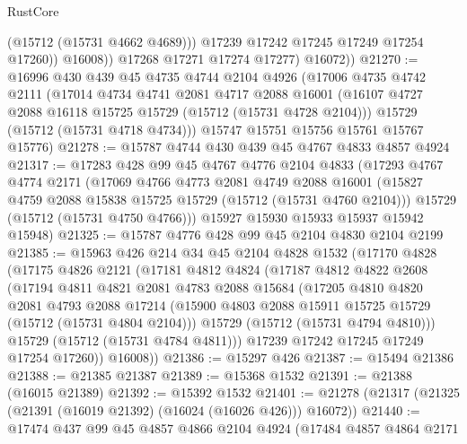 \begin{lexlean}{RustCore}
\begin{coremodule}
                    (@15712 (@15731 @4662 @4689)))
                  @17239
                  @17242
                  @17245
                  @17249
                  @17254
                  @17260))
              @16008))
          @17268
          @17271
          @17274
          @17277)
        @16072))
@21270 := @16996
    @430
    @439
    @45
    @4735
    @4744
    @2104
    @4926
    (@17006
      @4735
      @4742
      @2111
      (@17014
        @4734
        @4741
        @2081
        @4717
        @2088
        @16001
        (@16107 @4727 @2088 @16118 @15725 @15729 (@15712 (@15731 @4728 @2104)))
        @15729
        (@15712 (@15731 @4718 @4734)))
      @15747
      @15751
      @15756
      @15761
      @15767
      @15776)
@21278 := @15787 @4744 @430 @439 @45 @4767 @4833 @4857 @4924
@21317 := @17283
    @428
    @99
    @45
    @4767
    @4776
    @2104
    @4833
    (@17293
      @4767
      @4774
      @2171
      (@17069
        @4766
        @4773
        @2081
        @4749
        @2088
        @16001
        (@15827 @4759 @2088 @15838 @15725 @15729 (@15712 (@15731 @4760 @2104)))
        @15729
        (@15712 (@15731 @4750 @4766)))
      @15927
      @15930
      @15933
      @15937
      @15942
      @15948)
@21325 := @15787 @4776 @428 @99 @45 @2104 @4830 @2104 @2199
@21385 := @15963
    @426
    @214
    @34
    @45
    @2104
    @4828
    @1532
    (@17170
      @4828
      (@17175
        @4826
        @2121
        (@17181
          @4812
          @4824
          (@17187
            @4812
            @4822
            @2608
            (@17194
              @4811
              @4821
              @2081
              @4783
              @2088
              @15684
              (@17205
                @4810
                @4820
                @2081
                @4793
                @2088
                @17214
                (@15900 @4803 @2088 @15911 @15725 @15729 (@15712 (@15731 @4804 @2104)))
                @15729
                (@15712 (@15731 @4794 @4810)))
              @15729
              (@15712 (@15731 @4784 @4811)))
            @17239
            @17242
            @17245
            @17249
            @17254
            @17260))
        @16008))
@21386 := @15297 @426
@21387 := @15494 @21386
@21388 := @21385 @21387
@21389 := @15368 @1532
@21391 := @21388 (@16015 @21389)
@21392 := @15392 @1532
@21401 := @21278 (@21317 (@21325 (@21391 (@16019 @21392) (@16024 (@16026 @426))) @16072))
@21440 := @17474
    @437
    @99
    @45
    @4857
    @4866
    @2104
    @4924
    (@17484
      @4857
      @4864
      @2171

\end{coremodule}
\end{lexlean}
